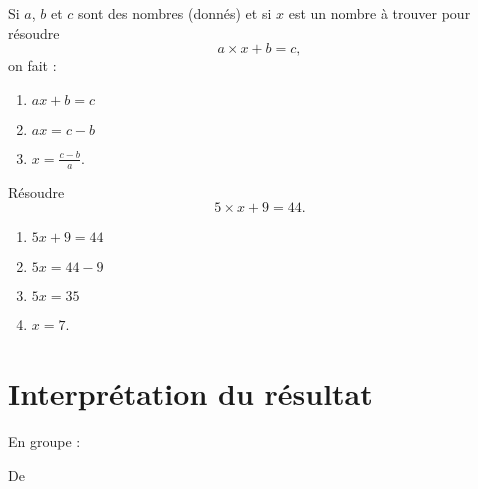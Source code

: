 Si \( a\), \( b\) et \( c\) sont des nombres (donnés) et si \( x\) est un nombre à trouver pour résoudre
\begin{equation}
    a\times x+b=c,
\end{equation}
on fait :
\begin{enumerate}
    \item
        $ax+b=c$
    \item
        $ax=c-b$
    \item
        $x=\frac{ c-b }{ a }$.
\end{enumerate}

\begin{example}
    Résoudre
    \begin{equation}
        5\times x+9=44.
    \end{equation}
    \begin{enumerate}
        \item
            \( 5x+9=44\)
        \item
            \( 5x=44-9\)
        \item
             \( 5x=35\)
         \item
             \( x=7\).
    \end{enumerate}
\end{example}

\section{Interprétation du résultat}

En groupe :

De \cite{NRHooXFvgpp4}

